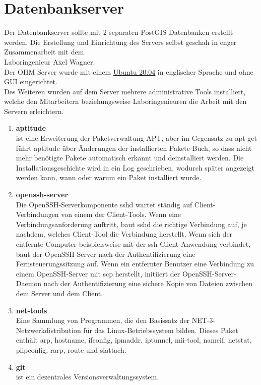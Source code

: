 \chapter{Datenbankserver}
Der Datenbankserver sollte mit 2 separaten PostGIS Datenbanken erstellt werden. Die Erstellung und Einrichtung des Servers selbst geschah in enger Zusammenarbeit mit dem \\
Laboringenieur Axel Wagner.\\
Der OHM Server wurde mit einem \href{https://releases.ubuntu.com/20.04/}{\underline{Ubuntu 20.04}} in englischer Sprache und ohne \ac{GUI} eingerichtet.\\
Des Weiteren wurden auf dem Server mehrere administrative Tools installiert, welche den Mitarbeitern beziehungsweise Laboringenieuren die Arbeit mit den Servern erleichtern.
\begin{enumerate}[label=\textbf{\arabic*.}]
	\item \textbf{aptitude}\\ist eine Erweiterung der Paketverwaltung APT, aber im Gegensatz zu apt-get führt aptitude über Änderungen der installierten Pakete  Buch, so dass nicht mehr benötigte Pakete automatisch erkannt und deinstalliert werden. Die Installationsgeschichte wird in ein Log geschrieben, wodurch später angezeigt werden kann, wann oder warum ein Paket installiert wurde.
	\item \textbf{openssh-server}\\Die OpenSSH-Serverkomponente sshd wartet ständig auf Client-Verbindungen von einem der Client-Tools. Wenn eine Verbindungsanforderung auftritt, baut sshd die richtige Verbindung auf, je nachdem, welches Client-Tool die Verbindung herstellt. Wenn sich der entfernte Computer beispielsweise mit der ssh-Client-Anwendung verbindet, baut der OpenSSH-Server nach der Authentifizierung eine Fernsteuerungssitzung auf. Wenn ein entfernter Benutzer eine Verbindung zu einem OpenSSH-Server mit scp herstellt, initiiert der OpenSSH-Server-Daemon nach der Authentifizierung eine sichere Kopie von Dateien zwischen dem Server und dem Client.
	\item \textbf{net-tools}\\Eine Sammlung von Programmen, die den Basissatz der NET-3-Netzwerkdistribution für das Linux-Betriebssystem bilden. Dieses Paket enthält arp, hostname, ifconfig, ipmaddr, iptunnel, mii-tool, nameif, netstat, plipconfig, rarp, route und slattach.
	\item \textbf{git}\\ist ein dezentrales Versionsverwaltungssystem.

\end{enumerate}
